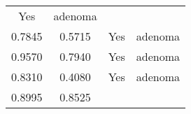 \documentclass[12pt,]{article}
\begin{document}
\begin{longtable}[]{@{}cccc@{}}
\begin{minipage}[t]{0.22\columnwidth}
Yes\strut
\end{minipage} & \begin{minipage}[t]{0.16\columnwidth}\centering\strut
adenoma\strut
\end{minipage}\tabularnewline
\begin{minipage}[t]{0.24\columnwidth}\centering\strut
0.7845\strut
\end{minipage} & \begin{minipage}[t]{0.26\columnwidth}\centering\strut
0.5715\strut
\end{minipage} & \begin{minipage}[t]{0.22\columnwidth}\centering\strut
Yes\strut
\end{minipage} & \begin{minipage}[t]{0.16\columnwidth}\centering\strut
adenoma\strut
\end{minipage}\tabularnewline
\begin{minipage}[t]{0.24\columnwidth}\centering\strut
0.9570\strut
\end{minipage} & \begin{minipage}[t]{0.26\columnwidth}\centering\strut
0.7940\strut
\end{minipage} & \begin{minipage}[t]{0.22\columnwidth}\centering\strut
Yes\strut
\end{minipage} & \begin{minipage}[t]{0.16\columnwidth}\centering\strut
adenoma\strut
\end{minipage}\tabularnewline
\begin{minipage}[t]{0.24\columnwidth}\centering\strut
0.8310\strut
\end{minipage} & \begin{minipage}[t]{0.26\columnwidth}\centering\strut
0.4080\strut
\end{minipage} & \begin{minipage}[t]{0.22\columnwidth}\centering\strut
Yes\strut
\end{minipage} & \begin{minipage}[t]{0.16\columnwidth}\centering\strut
adenoma\strut
\end{minipage}\tabularnewline
\begin{minipage}[t]{0.24\columnwidth}\centering\strut
0.8995\strut
\end{minipage} & \begin{minipage}[t]{0.26\columnwidth}\centering\strut
0.8525\strut
\end{minipage} & \begin{minipage}[t]{0.22\columnwidth}\centering\strut

\end{minipage}
\end{longtable}
\end{document}
